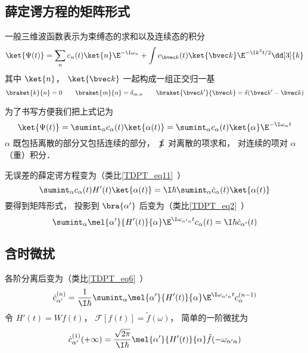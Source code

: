 

\subsection{薛定谔方程的矩阵形式}
一般三维波函数表示为束缚态的求和以及连续态的积分
\begin{equation}
\ket{\Psi(t)} = \sum_n c_n(t)\ket{n}\E^{-\I\omega_n} + \int c_{\bvec k}(t)\ket{\bvec k}\E^{-\I k^2 t/2} \dd[3]{k}
\end{equation}
其中 $\ket{n}$， $\ket{\bvec k}$ 一起构成一组正交归一基
\begin{equation}
\braket{k}{n} = 0 \qquad \braket{m}{n} = \delta_{m,n} \qquad \braket{\bvec k'}{\bvec k} = \delta(\bvec k' - \bvec k)
\end{equation}

为了书写方便我们把上式记为
\begin{equation}
\ket{\Psi(t)} = \sumint_\alpha c_\alpha(t) \ket{\alpha(t)} = \sumint_\alpha c_\alpha(t) \ket{\alpha}\E^{-\I\omega_\alpha t} 
\end{equation}
$\alpha$ 既包括离散的部分又包括连续的部分， $\sumint$ 对离散的项求和， 对连续的项对 $\alpha$ （重）积分．

无误差的薛定谔方程变为（类比\autoref{TDPT_eq11}~）
\begin{equation}
\sumint_\alpha c_\alpha(t) H'(t) \ket{\alpha(t)} = \I \hbar \sumint_\alpha \dot c_\alpha(t) \ket{\alpha(t)}
\end{equation}
要得到矩阵形式， 投影到 $\bra{\alpha'}$ 后变为（类比\autoref{TDPT_eq2}~）
\begin{equation}
\sumint_\alpha \mel{\alpha'}{H'(t)}{\alpha} \E^{\I \omega_{\alpha'\alpha} t} c_\alpha(t)
= \I \hbar \dot c_{\alpha'} (t)
\end{equation}

\subsection{含时微扰}
各阶分离后变为（类比\autoref{TDPT_eq6}~）
\begin{equation}
\dot c_{\alpha'}^{(n)} = \frac{1}{\I\hbar} \sumint_\alpha \mel{\alpha'}{H'(t)}{\alpha} \E^{\I \omega_{\alpha'\alpha} t} c_{\alpha}^{(n-1)} 
\end{equation}
令 $H'(t) = W f(t)$， $\mathcal F[f(t)] = \tilde f(\omega)$， 简单的一阶微扰为
\begin{equation}\label{TDPTc_eq1}
\dot c_{\alpha'}^{(1)}(+\infty) = \frac{\sqrt{2\pi}}{\I\hbar} \mel{\alpha'}{H'(t)}{\alpha} \tilde f(-\omega_{\alpha'\alpha})
\end{equation}


